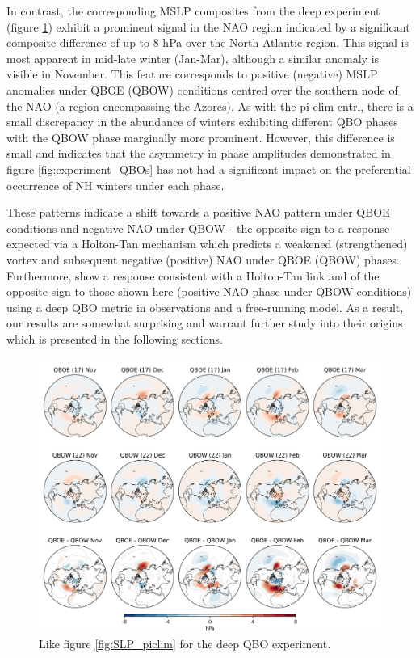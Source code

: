 In contrast, the corresponding MSLP composites from the deep experiment (figure \ref{fig:SLP_deep}) exhibit a prominent signal in the NAO region indicated by a significant composite difference of up to 8 hPa over the North Atlantic region. This signal is most apparent in mid-late winter (Jan-Mar), although a similar anomaly is visible in November. This feature corresponds to positive (negative) MSLP anomalies under QBOE (QBOW) conditions centred over the southern node of the NAO (a region encompassing the Azores). As with the pi-clim cntrl, there is a small discrepancy in the abundance of winters exhibiting different QBO phases with the QBOW phase marginally more prominent. However, this difference is small and indicates that the asymmetry in phase amplitudes demonstrated in figure \ref{fig:experiment_QBOs} has not had a significant impact on the preferential occurrence of NH winters under each phase.

These patterns indicate a shift towards a positive NAO pattern under QBOE conditions and negative NAO under QBOW - the opposite sign to a response expected via a Holton-Tan mechanism which predicts a weakened (strengthened) vortex and subsequent negative (positive) NAO under QBOE (QBOW) phases. Furthermore, \cite{andrewsObserved2019d} show a response consistent with a Holton-Tan link and of the opposite sign to those shown here (positive NAO phase under QBOW conditions) using a deep QBO metric in observations and a free-running model. As a result, our results are somewhat surprising and warrant further study into their origins which is presented in the following sections.
\begin{figure}[h!]
\begin{center}
\noindent\includegraphics[width =0.8\linewidth]{Figures/Figures-deepQBO/LAGGED_SLP_composites_individual_months_QBO_phases_U_d_higher_50hPa_5thresh.png}
\caption[MSLP composites under QBO phases in the deep QBO simulation]{Like figure \ref{fig:SLP_piclim} for the deep QBO experiment.}
\label{fig:SLP_deep}
\end{center}
\end{figure}

